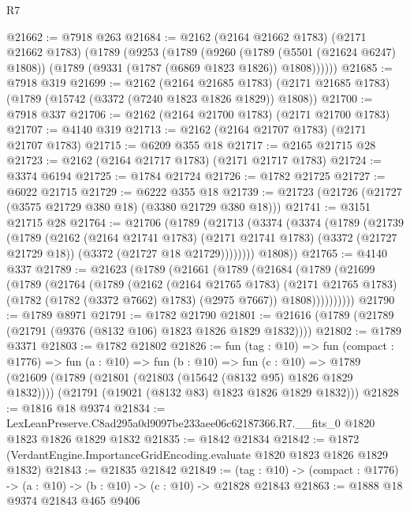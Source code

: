 \begin{lexlean}{R7}
\begin{coremodule}
@21662 := @7918 @263
@21684 := @2162
    (@2164 @21662 @1783)
    (@2171 @21662 @1783)
    (@1789
      (@9253
        (@1789
          (@9260
            (@1789 (@5501 (@21624 @6247) @1808))
            (@1789 (@9331 (@1787 (@6869 @1823 @1826)) @1808))))))
@21685 := @7918 @319
@21699 := @2162
    (@2164 @21685 @1783)
    (@2171 @21685 @1783)
    (@1789 (@15742 (@3372 (@7240 @1823 @1826 @1829)) @1808))
@21700 := @7918 @337
@21706 := @2162 (@2164 @21700 @1783) (@2171 @21700 @1783)
@21707 := @4140 @319
@21713 := @2162 (@2164 @21707 @1783) (@2171 @21707 @1783)
@21715 := @6209 @355 @18
@21717 := @2165 @21715 @28
@21723 := @2162 (@2164 @21717 @1783) (@2171 @21717 @1783)
@21724 := @3374 @6194
@21725 := @1784 @21724
@21726 := @1782 @21725
@21727 := @6022 @21715
@21729 := @6222 @355 @18
@21739 := @21723 (@21726 (@21727 (@3575 @21729 @380 @18) (@3380 @21729 @380 @18)))
@21741 := @3151 @21715 @28
@21764 := @21706
    (@1789
      (@21713
        (@3374
          (@3374
            (@1789
              (@21739
                (@1789
                  (@2162
                    (@2164 @21741 @1783)
                    (@2171 @21741 @1783)
                    (@3372 (@21727 @21729 @18))
                    (@3372 (@21727 @18 @21729))))))))
        @1808))
@21765 := @4140 @337
@21789 := @21623
    (@1789
      (@21661
        (@1789
          (@21684
            (@1789
              (@21699
                (@1789
                  (@21764
                    (@1789
                      (@2162
                        (@2164 @21765 @1783)
                        (@2171 @21765 @1783)
                        (@1782 (@1782 (@3372 @7662) @1783) (@2975 @7667))
                        @1808))))))))))
@21790 := @1789 @8971
@21791 := @1782 @21790
@21801 := @21616 (@1789 (@21789 (@21791 (@9376 (@8132 @106) @1823 @1826 @1829 @1832))))
@21802 := @1789 @3371
@21803 := @1782 @21802
@21826 := fun (tag : @10) =>
  fun (compact : @1776) =>
  fun (a : @10) =>
  fun (b : @10) =>
  fun (c : @10) =>
  @1789
    (@21609
      (@1789 (@21801 (@21803 (@15642 (@8132 @95) @1826 @1829 @1832))))
      (@21791 (@19021 (@8132 @83) @1823 @1826 @1829 @1832)))
@21828 := @1816 @18 @9374
@21834 := LexLeanPreserve.C8ad295a0d9097be233aee06c62187366.R7.__fits_0
    @1820
    @1823
    @1826
    @1829
    @1832
@21835 := @1842 @21834
@21842 := @1872 (VerdantEngine.ImportanceGridEncoding.evaluate @1820 @1823 @1826 @1829 @1832)
@21843 := @21835 @21842
@21849 := (tag : @10) -> (compact : @1776) -> (a : @10) -> (b : @10) -> (c : @10) -> @21828 @21843
@21863 := @1888
    @18
    @9374
    @21843
    @465
    @9406

\end{coremodule}
\end{lexlean}
